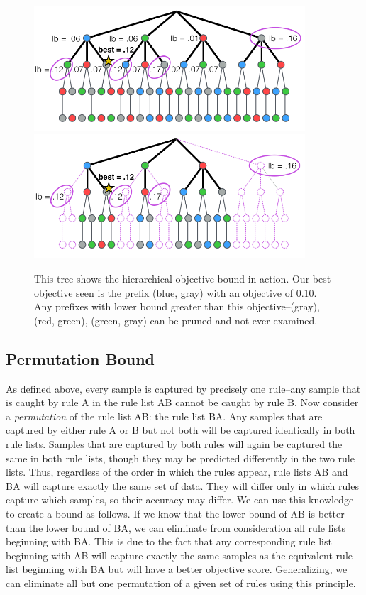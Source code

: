 \begin{figure}
\includegraphics[width=0.9\textwidth]{figs/branch-and-bound-tree.png}
\includegraphics[width=0.9\textwidth]{figs/branch-and-bound-tree-pruned.png}
\caption[Objective bound]{This tree shows the hierarchical objective bound in action. Our best objective seen is the prefix (blue, gray) with an objective of $0.10$. Any prefixes with lower bound greater than this objective--(gray), (red, green), (green, gray) can be pruned and not ever examined.
\label{fig:objective-bound}}
\end{figure}

\subsection{Permutation Bound}

As defined above, every sample is captured by precisely one rule--any sample that is caught by rule A in the rule list AB cannot be caught by rule B. 
Now consider a \textit{permutation} of the rule list AB: the rule list BA.
Any samples that are captured by either rule A or B but not both will be captured identically in both rule lists.
Samples that are captured by both rules will again be captured the same in both rule lists, though they may be predicted differently in the two rule lists.
Thus, regardless of the order in which the rules appear, rule lists AB and BA will capture exactly the same set of data.
They will differ only in which rules capture which samples, so their accuracy may differ. 
We can use this knowledge to create a bound as follows.
If we know that the lower bound of AB is better than the lower bound of BA, we can eliminate from consideration all rule lists beginning with BA.
This is due to the fact that any corresponding rule list beginning with AB will capture exactly the same samples as the equivalent rule list beginning with BA but will have a better objective score.
Generalizing, we can eliminate all but one permutation of a given set of rules using this principle.

